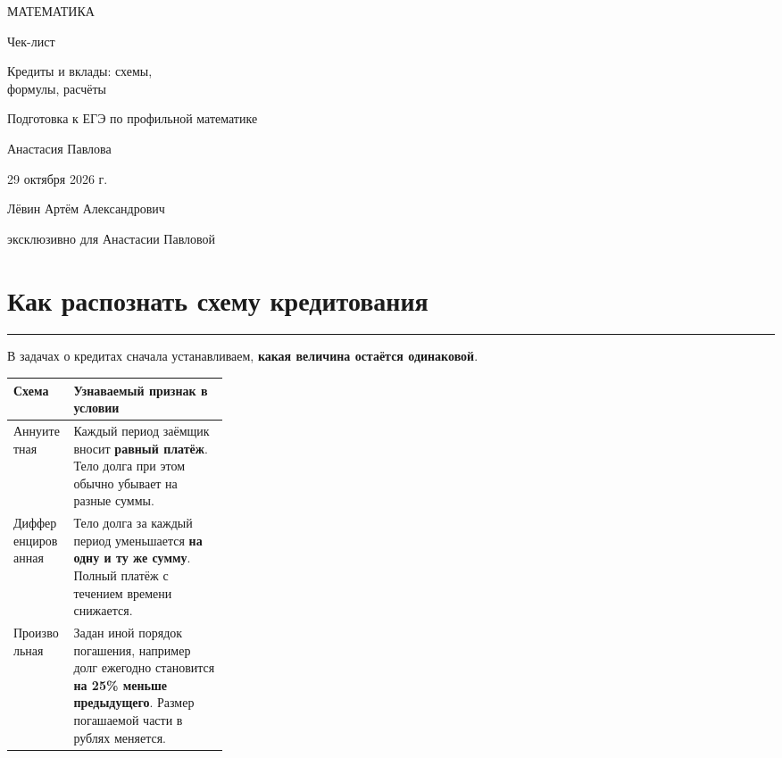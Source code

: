\documentclass[a4paper,11pt]{article}
\newcommand{\key}[1]{\textcolor{darkaccent}{\textbf{#1}}}
\newcommand{\sepheading}[1]{\section{#1}\vspace{-4pt}\noindent\textcolor{accent}{\rule{\linewidth}{0.45pt}}\vspace{1pt}}
\begin{document}
\begin{titlepage}
\thispagestyle{empty}
\begin{center}
\vspace*{31mm}
{\large\color{darkaccent}МАТЕМАТИКА}\par
\vspace{17mm}
{\LARGE Чек-лист}\par
\vspace{12mm}
{\LARGE\color{accent}Кредиты и вклады: схемы,\\[2mm] формулы, расчёты}\par
\vspace{15mm}
{\normalsize Подготовка к ЕГЭ по профильной математике}\par
\vfill
{\large Анастасия Павлова}\par
\vspace{12mm}
{\large 29 октября 2026 г.}\par
\vspace{20mm}
{\small Лёвин Артём Александрович}\par
{\small эксклюзивно для Анастасии Павловой}\par
\vspace{19mm}
\end{center}
\end{titlepage}

\sepheading{Как распознать схему кредитования}
В задачах о кредитах сначала устанавливаем, \key{какая величина остаётся одинаковой}.

\begin{tabularx}{\linewidth}{@{}p{0.28\linewidth} X@{}}
\toprule
\textbf{Схема} & \textbf{Узнаваемый признак в условии}\\
\midrule
Аннуитетная & Каждый период заёмщик вносит \textbf{равный платёж}. Тело долга при этом обычно убывает на разные суммы.\\[3pt]
Дифференцированная & Тело долга за каждый период уменьшается \textbf{на одну и ту же сумму}. Полный платёж с течением времени снижается.\\[3pt]
Произвольная & Задан иной порядок погашения, например долг ежегодно становится \textbf{на 25\% меньше предыдущего}. Размер погашаемой части в рублях меняется.\\
\bottomrule
\end{tabularx}
\end{document}
